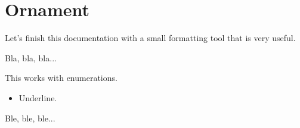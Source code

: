 \documentclass{tutodoc}
\begin{document}
\section{Ornament}

Let's finish this documentation with a small formatting tool that is very useful.


\begin{tdoclatex}[sbs]
Bla, bla, bla...

\tdocsep %

This works with enumerations.

\begin{itemize}
    \item Underline.
\end{itemize}

\tdocsep %

Ble, ble, ble...
\end{tdoclatex}
\end{document}
